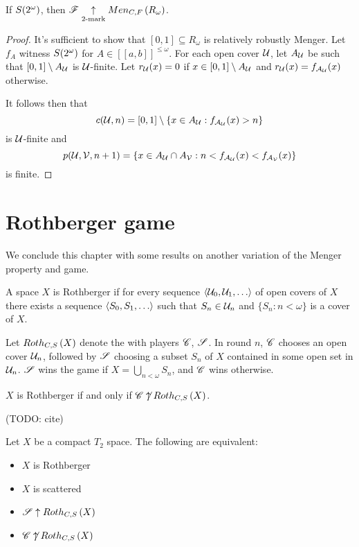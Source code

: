 \begin{thm}
  If $S(2^\omega)$, then $\mathscr{F}\underset{2\text{-mark}}{\uparrow}Men_{C,F}\left({R_\omega}\right)$.
\end{thm}

\begin{proof}
  It's sufficient to show that $[0,1]\subseteq R_\omega$ is relatively
  robustly Menger. Let $f_A$ witness $S(2^\omega)$
  for $A\in[[a,b]]^{\leq\omega}$.
  For each open cover $\mathcal{U}$, let $A_{\mathcal{U}}$ be
  such that $[0,1]\setminus A_{\mathcal{U}}$ is $\mathcal{U}$-finite.
  Let $r_{\mathcal{U}}(x)=0$ if $x\in[0,1]\setminus A_{\mathcal{U}}$ and
  $r_{\mathcal{U}}(x)=f_{\mathcal{A}_{\mathcal{U}}}(x)$ otherwise.

  It follows then that
    \[
      c(\mathcal{U},n) = [0,1]\setminus\{x\in A_{\mathcal{U}}:f_{\mathcal{A}_{\mathcal{U}}}(x)>n\}
    \]
  is $\mathcal{U}$-finite and
    \[
      p(\mathcal{U},\mathcal{V},n+1)
        =
      \{x\in A_{\mathcal{U}}\cap A_{\mathcal{V}}
        :
      n<f_{\mathcal{A}_{\mathcal{U}}}(x)<f_{\mathcal{A}_{\mathcal{V}}}(x)\}
    \]
  is finite.
\end{proof}


\section{Rothberger game}

We conclude this chapter with some results on another variation of the
Menger property and game.

\begin{defn}
  A space $X$ is Rothberger if for every sequence $\<\mc U_0,\mc U_1,\dots\>$
  of open covers of $X$ there exists a sequence
  $\<S_0,S_1,\dots\>$ such that $S_n\in\mathcal{U}_n$
  and $\{S_n:n<\omega\}$ is a cover of $X$.
\end{defn}

\begin{game}
  Let $Roth_{C,S}\left({X}\right)$ denote the  with players $\mathscr{C}$,
  $\mathscr{S}$.
  In round $n$, $\mathscr{C}$ chooses an open cover $\mathcal{U}_n$, followed by $\mathscr{S}$
  choosing a subset $S_n$ of $X$ contained in some open set in $\mathcal{U}_n$.
  $\mathscr{S}$ wins the game if $X = \bigcup_{n<\omega}S_n$,
  and $\mathscr{C}$ wins otherwise.
\end{game}

\begin{thm}
  $X$ is Rothberger if and only if $\mathscr{C}\not\uparrow Roth_{C,S}\left({X}\right)$.
  \cite{MR1279482}
\end{thm}

(TODO: cite)

\begin{thm}
  Let $X$ be a compact $T_2$ space. The following are equivalent:
    \begin{itemize}
      \item $X$ is Rothberger
      \item $X$ is scattered
      \item $\mathscr{S}\uparrow Roth_{C,S}\left({X}\right)$
      \item $\mathscr{C}\not\uparrow Roth_{C,S}\left({X}\right)$
    \end{itemize}
\end{thm}

